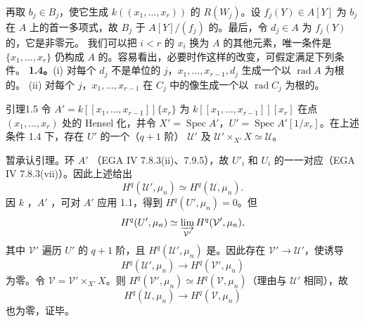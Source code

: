再取 $b_j\in B_j$，使它生成 $k((x_1,\ldots,x_r))$ 的 $R(W_j)$。设 $f_j(Y)\in A[Y]$ 为 $b_j$ 在 $A$ 上的首一多项式，故 $B_j$ 于 $A[Y]/(f_j)$ 的。最后，令 $d_j\in A$ 为 $f_j(Y)$ 的，它是非零元。
我们可以把 $i<r$ 的 $x_i$ 换为 $A$ 的其他元素，唯一条件是 $\{x_1,\ldots,x_r\}$ 仍构成 $A$ 的。容易看出，必要时作这样的改变，可假定满足下列条件。
\textbf{1.4。}(i) 对每个 $d_j$ 不是单位的 $j$，$x_1,\ldots,x_{r-1},d_j$ 生成一个以 $\operatorname{rad}A$ 为根的。
(ii) 对每个 $j$，$x_1,\ldots,x_{r-1}$ 在 $C_j$ 中的像生成一个以 $\operatorname{rad}C_j$ 为根的。
\begin{SGAresult}{引理}{1.5}
令 $A'=k[[x_1,\ldots,x_{r-1}]]\{x_r\}$ 为 $k[[x_1,\ldots,x_{r-1}]][x_r]$ 在点 $(x_1,\ldots,x_r)$ 处的 Hensel 化，并令 $X'=\operatorname{Spec}A'$，$U'=\operatorname{Spec}A'[1/x_r]$。在上述条件 1.4 下，存在 $U'$ 的一个（$q+1$ 阶） $\mathcal U'$ 及 $\mathcal U'\times_{X'}X\simeq\mathcal U$。
\end{SGAresult}
暂承认引理。环 $A'$ （EGA IV 7.8.3(ii)、7.9.5），故 $U'_i$ 和 $U_i$ 的一一对应（EGA IV 7.8.3(vii)）。因此上述给出
\[H^q(\mathcal U',\mu_n)\simeq H^q(\mathcal U,\mu_n).\]
因 $k$ ，$A'$ ，可对 $A'$ 应用 1.1，得到 $H^q(U',\mu_n)=0$。但
\[H^q(U',\mu_n)\simeq\varinjlim_{\mathcal V'}H^q(\mathcal V',\mu_n),\]
其中 $\mathcal V'$ 遍历 $U'$ 的 $q+1$ 阶，且 $H^q(\mathcal U',\mu_n)$ 是。因此存在 $\mathcal V'\to\mathcal U'$，使诱导
\[H^q(\mathcal U',\mu_n)\longrightarrow H^q(\mathcal V',\mu_n)\]
为零。令 $\mathcal V=\mathcal V'\times_{X'}X$。则 $H^q(\mathcal V',\mu_n)\simeq H^q(\mathcal V,\mu_n)$（理由与 $\mathcal U'$ 相同），故
\[H^q(\mathcal U,\mu_n)\longrightarrow H^q(\mathcal V,\mu_n)\]
也为零，证毕。
